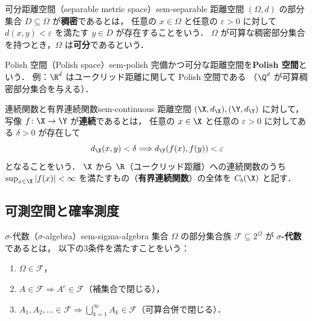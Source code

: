 \begin{definition}{可分距離空間（separable metric space）}{sem-separable}
  距離空間 $(\Omega, d)$ の部分集合 $D \subseteq \Omega$ が\textbf{稠密}であるとは，
  任意の $x \in \Omega$ と任意の $\varepsilon > 0$
  に対して $d(x, y) < \varepsilon$ を満たす $y \in D$ が存在することをいう．
  $\Omega$ が可算な稠密部分集合を持つとき，$\Omega$ は\textbf{可分}であるという．
\end{definition}

\begin{definition}{Polish 空間（Polish space）}{sem-polish}
  完備かつ可分な距離空間を\textbf{Polish 空間}という．
  例：$\R^d$ はユークリッド距離に関して Polish 空間である
  （$\Q^d$ が可算稠密部分集合を与える）．
\end{definition}

\begin{definition}{連続関数と有界連続関数}{sem-continuous}
  距離空間 $(\X, d_\X), (\Y, d_\Y)$ に対して，
  写像 $f \colon \X \to \Y$ が\textbf{連続}であるとは，
  任意の $x \in \X$ と任意の $\varepsilon > 0$ に対してある $\delta > 0$ が存在して
  \[
    d_\X(x, y) < \delta \Longrightarrow d_\Y(f(x), f(y)) < \varepsilon
  \]
  となることをいう．
  $\X$ から $\R$（ユークリッド距離）への連続関数のうち
  $\sup_{x \in \X} |f(x)| < \infty$ を満たすもの（\textbf{有界連続関数}）の全体を
  $C_b(\X)$ と記す．
\end{definition}

\subsection{可測空間と確率測度}
\label{sec:sem-measurable}

\begin{definition}{$\sigma$-代数（$\sigma$-algebra）}{sem-sigma-algebra}
  集合 $\Omega$ の部分集合族 $\mathcal{F} \subseteq 2^{\Omega}$ が
  \textbf{$\sigma$-代数}であるとは，
  以下の3条件を満たすことをいう：
  \begin{enumerate}
    \item[(i)] $\Omega \in \mathcal{F}$，
    \item[(ii)] $A \in \mathcal{F} \Longrightarrow A^c \in \mathcal{F}$（補集合で閉じる），
    \item[(iii)] $A_1, A_2, \ldots \in \mathcal{F} \Longrightarrow
      \bigcup_{k=1}^{\infty} A_k \in \mathcal{F}$（可算合併で閉じる）．
  \end{enumerate}
\end{definition}

